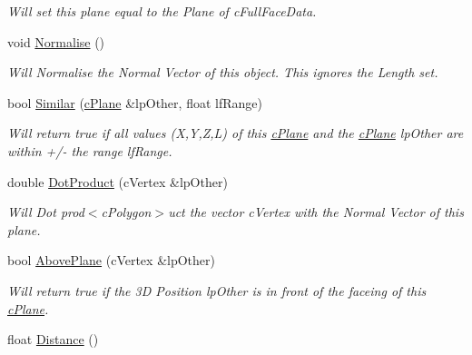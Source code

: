 \begin{DoxyCompactItemize}
\begin{DoxyCompactList}\small\item\em Will set this plane equal to the Plane of cFullFaceData. \end{DoxyCompactList}\item 
\hypertarget{classc_plane_a0b21c98214762e53d072962a16eb39cf}{
void \hyperlink{classc_plane_a0b21c98214762e53d072962a16eb39cf}{Normalise} ()}
\label{classc_plane_a0b21c98214762e53d072962a16eb39cf}

\begin{DoxyCompactList}\small\item\em Will Normalise the Normal Vector of this object. This ignores the Length set. \end{DoxyCompactList}\item 
\hypertarget{classc_plane_a54a4b9d1cc5624882862ea31f3d0df47}{
bool \hyperlink{classc_plane_a54a4b9d1cc5624882862ea31f3d0df47}{Similar} (\hyperlink{classc_plane}{cPlane} \&lpOther, float lfRange)}
\label{classc_plane_a54a4b9d1cc5624882862ea31f3d0df47}

\begin{DoxyCompactList}\small\item\em Will return true if all values (X,Y,Z,L) of this \hyperlink{classc_plane}{cPlane} and the \hyperlink{classc_plane}{cPlane} lpOther are within +/-\/ the range lfRange. \end{DoxyCompactList}\item 
\hypertarget{classc_plane_a1861b4a3e79e16889324f0c9e580fc06}{
double \hyperlink{classc_plane_a1861b4a3e79e16889324f0c9e580fc06}{DotProduct} (cVertex \&lpOther)}
\label{classc_plane_a1861b4a3e79e16889324f0c9e580fc06}

\begin{DoxyCompactList}\small\item\em Will Dot prod$<$cPolygon$>$uct the vector cVertex with the Normal Vector of this plane. \end{DoxyCompactList}\item 
\hypertarget{classc_plane_a44e9d118b30acf0b618ada7de16aa905}{
bool \hyperlink{classc_plane_a44e9d118b30acf0b618ada7de16aa905}{AbovePlane} (cVertex \&lpOther)}
\label{classc_plane_a44e9d118b30acf0b618ada7de16aa905}

\begin{DoxyCompactList}\small\item\em Will return true if the 3D Position lpOther is in front of the faceing of this \hyperlink{classc_plane}{cPlane}. \end{DoxyCompactList}\item 
\hypertarget{classc_plane_a791c2367a99bb9818e4235962bfe504f}{
float \hyperlink{classc_plane_a791c2367a99bb9818e4235962bfe504f}{Distance} ()}
\label{classc_plane_a791c2367a99bb9818e4235962bfe504f}


\end{DoxyCompactItemize}
